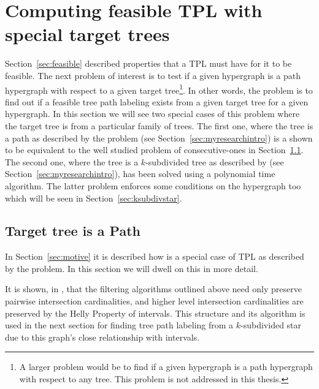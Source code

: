 \section[Special target trees]{ Computing feasible TPL with special target trees}
\label{sec:spltargettree}

Section~\ref{sec:feasible} described properties that a TPL must have
for it to be feasible. The next problem of interest is to test if a
given hypergraph is a path hypergraph with respect to a given target
tree\footnote{A larger problem would be to find if a given hypergraph
  is a path hypergraph with respect to any tree. This problem is not
  addressed in this thesis.}.  In other words, the problem is to find
out if a feasible tree path labeling exists from a given target tree
for a given hypergraph. In this section we will see two special cases
of this problem where the target tree is from a particular family of
trees. The first one, where the tree is a path as described by the
\CFTPLINT problem (see Section~\ref{sec:myresearchintro}) is a shown
to be equivalent to the well studied problem of consecutive-ones in
Section~\ref{sec:icpplicpia}. The second one, where the tree is a
$k$-subdivided tree as described by \CFTPLKTREE (see
Section~\ref{sec:myresearchintro}), has been solved using a polynomial
time algorithm. The latter problem enforces some conditions on the
hypergraph too which will be seen in Section~\ref{sec:ksubdivstar}.

\subsection{Target tree is a Path}
\label{sec:icpplicpia}

In Section~\ref{sec:motive} it is described how \COP is a
special case of TPL as described by the \CFTPLINT problem. In this
section we will dwell on this in more detail.


It is shown, in \cite{nsnrs09}, that the
filtering algorithms outlined above need only preserve pairwise
intersection cardinalities, and higher level intersection
cardinalities are preserved by the Helly Property of intervals.
This structure and its algorithm is used in the next section for
finding tree path labeling from a $k$-subdivided star due to this
graph's close relationship with intervals.

